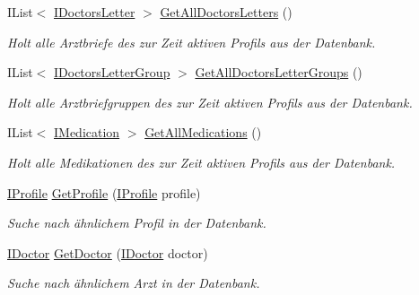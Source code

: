 \begin{CompactItemize}
IList$<$ \hyperlink{interfacemy_m_d_1_1_model_interface_1_1_data_model_interface_1_1_i_doctors_letter}{IDoctors\-Letter} $>$ \hyperlink{interfacemy_m_d_1_1_model_1_1_database_model_1_1_i_entity_database_d824e78a8274c2fc04719a66a7030fd7}{Get\-All\-Doctors\-Letters} ()
\begin{CompactList}\small\item\em Holt alle Arztbriefe des zur Zeit aktiven Profils aus der Datenbank. \item\end{CompactList}\item 
IList$<$ \hyperlink{interfacemy_m_d_1_1_model_interface_1_1_data_model_interface_1_1_i_doctors_letter_group}{IDoctors\-Letter\-Group} $>$ \hyperlink{interfacemy_m_d_1_1_model_1_1_database_model_1_1_i_entity_database_ebf03ac78145d306eed6f8bb7a92934f}{Get\-All\-Doctors\-Letter\-Groups} ()
\begin{CompactList}\small\item\em Holt alle Arztbriefgruppen des zur Zeit aktiven Profils aus der Datenbank. \item\end{CompactList}\item 
IList$<$ \hyperlink{interfacemy_m_d_1_1_model_interface_1_1_data_model_interface_1_1_i_medication}{IMedication} $>$ \hyperlink{interfacemy_m_d_1_1_model_1_1_database_model_1_1_i_entity_database_ecff6715a9c8e9604242cc7a688c9939}{Get\-All\-Medications} ()
\begin{CompactList}\small\item\em Holt alle Medikationen des zur Zeit aktiven Profils aus der Datenbank. \item\end{CompactList}\item 
\hyperlink{interfacemy_m_d_1_1_model_interface_1_1_data_model_interface_1_1_i_profile}{IProfile} \hyperlink{interfacemy_m_d_1_1_model_1_1_database_model_1_1_i_entity_database_a22117377d44ffae8e1381d0814d1960}{Get\-Profile} (\hyperlink{interfacemy_m_d_1_1_model_interface_1_1_data_model_interface_1_1_i_profile}{IProfile} profile)
\begin{CompactList}\small\item\em Suche nach \"{a}hnlichem Profil in der Datenbank. \item\end{CompactList}\item 
\hyperlink{interfacemy_m_d_1_1_model_interface_1_1_data_model_interface_1_1_i_doctor}{IDoctor} \hyperlink{interfacemy_m_d_1_1_model_1_1_database_model_1_1_i_entity_database_cc41e08b876f7f88b63138dc9ee26aea}{Get\-Doctor} (\hyperlink{interfacemy_m_d_1_1_model_interface_1_1_data_model_interface_1_1_i_doctor}{IDoctor} doctor)
\begin{CompactList}\small\item\em Suche nach \"{a}hnlichem Arzt in der Datenbank. \item\end{CompactList}\end{CompactItemize}


